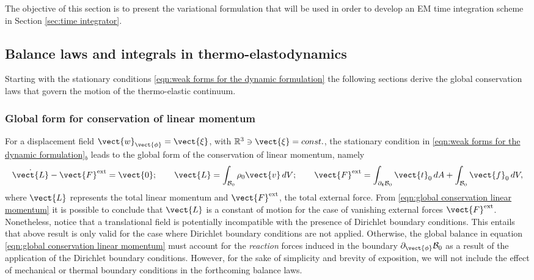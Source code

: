 The objective of this section is to present the variational formulation that will be used in order to develop an EM time integration scheme in Section \ref{sec:time integrator}. 


\subsection{Balance laws and integrals in thermo-elastodynamics}

Starting with the stationary conditions \eqref{eqn:weak forms for the dynamic formulation} %
the following sections  derive the global conservation laws that govern the motion of the thermo-elastic continuum.%

\subsubsection{Global form for conservation of linear momentum}\label{sec:conservation linear momentum global}

For a displacement field $\vect{w}_{\vect{\phi}} = \vect{\xi}$, with $\mathbb{R}^3\ni\vect{\xi}=const.$, the stationary condition in \eqref{eqn:weak forms for the dynamic formulation}$_b$ leads to the global form of the conservation of linear momentum, namely
%
\begin{equation}\label{eqn:global conservation linear momentum}
%
\dot{\vect{L}} - \vect{F}^{\text{ext}} = \vect{0};\qquad
%
{\vect{L}} = \int_{\mathcal{B}_0}\rho_0\vect{v}\,dV;\qquad
%
\vect{F}^{\text{ext}} =    
\int_{\partial_{\boldsymbol{t}}\mathcal{B}_0}\vect{t}_0\,dA
+\int_{\mathcal{B}_0}\vect{f}_0\,dV,
\end{equation}
%
where %
$\vect{L}$ represents the total linear momentum %
and $\vect{F}^{\text{ext}}$, the total external force.
From \eqref{eqn:global conservation linear momentum} it is possible to conclude that $\vect{L}$ is a constant of motion for the case of vanishing external forces $\vect{F}^{\text{ext}}$. Nonetheless, notice that a translational field is potentially incompatible with the presence of Dirichlet boundary conditions. This entails that above result is only valid for the case where Dirichlet boundary conditions are not applied. Otherwise, the global balance in equation \eqref{eqn:global conservation linear momentum} must account for the \textit{reaction} forces induced in the boundary $\partial_{\vect{\phi}}\mathcal{B}_0$ as a result of the application of the Dirichlet boundary conditions. However, for the {sake of simplicity} and brevity of exposition, we will not include the effect of mechanical or thermal boundary conditions in the forthcoming balance laws.   

